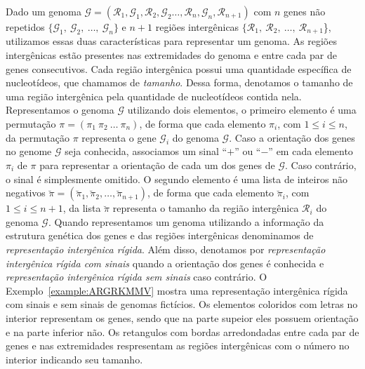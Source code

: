 Dado um genoma $\mathcal{G}=(\mathcal{R}_1,\mathcal{G}_1,\mathcal{R}_2,\mathcal{G}_2\dots,\mathcal{R}_n,\mathcal{G}_n,\mathcal{R}_{n+1})$ com $n$ genes não repetidos $\{\mathcal{G}_1,\:\mathcal{G}_2,\:\dots,\:\mathcal{G}_n\}$ e $n+1$ regiões intergênicas $\{\mathcal{R}_1,\:\mathcal{R}_2,\:\dots,\:\mathcal{R}_{n+1}$\}, utilizamos essas duas características para representar um genoma. As regiões intergênicas estão presentes nas extremidades do genoma e entre cada par de genes consecutivos. Cada região intergênica possui uma quantidade específica de nucleotídeos, que chamamos de \emph{tamanho}. Dessa forma, denotamos o tamanho de uma região intergênica pela quantidade de nucleotídeos contida nela. Representamos o genoma $\mathcal{G}$ utilizando dois elementos, o primeiro elemento é uma permutação $\pi=(\pi_1~\pi_2~\dots~\pi_n)$, de forma que cada elemento $\pi_i$, com $1 \le i \le n$, da permutação $\pi$ representa o gene $\mathcal{G}_i$ do genoma $\mathcal{G}$. Caso a orientação dos genes no genome $\mathcal{G}$ seja conhecida, associamos um sinal ``$+$'' ou ``$-$'' em cada elemento $\pi_i$ de $\pi$ para representar a orientação de cada um dos genes de $\mathcal{G}$. Caso contrário, o sinal é simplesmente omitido. O segundo elemento é uma lista de inteiros não negativos $\breve\pi=(\breve\pi_1,\breve\pi_2,\dots,\breve\pi_{n+1})$, de forma que cada elemento $\breve\pi_i$, com $1 \le i \le {n+1}$, da lista $\breve\pi$ representa o tamanho da região intergênica $\mathcal{R}_i$ do genoma $\mathcal{G}$. Quando representamos um genoma utilizando a informação da estrutura genética dos genes e das regiões intergênicas denominamos de \emph{representação intergênica rígida}. Além disso, denotamos por \emph{representação intergênica rígida com sinais} quando a orientação dos genes é conhecida e \emph{representação intergênica rígida sem sinais} caso contrário. O Exemplo~\ref{example:ARGRKMMV} mostra uma representação intergênica rígida com sinais e sem sinais de genomas fictícios. Os elementos coloridos com letras no interior representam os genes, sendo que na parte supeior eles possuem orientação e na parte inferior não. Os retangulos com bordas arredondadas entre cada par de genes e nas extremidades respresentam as regiões intergênicas com o número no interior indicando seu tamanho.



